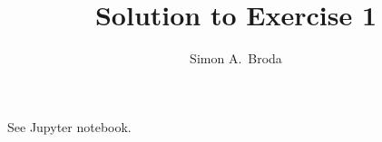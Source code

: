 \documentclass[11pt, a4paper]{article}
\begin{document}
\title{Solution to Exercise 1}
\author{Simon A.\ Broda}
\date{}
\maketitle
See Jupyter notebook.
\end{document}
